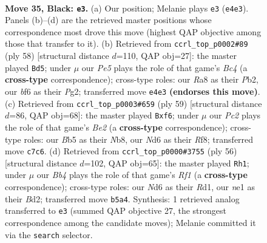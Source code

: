 \documentclass[11pt]{article}
\begin{document}
\clearpage

\begin{figure}[p]\centering
\begin{subfigure}{0.46\textwidth}\centering
\resizebox{\linewidth}{!}{%
\newchessgame
\chessboard[
  setfen={r3r3/1kp5/pP1n1B2/1b1N1p2/4p2R/1B6/1P3PP1/R2KN3 b - - 2 35},
  showmover=false,
  pgfstyle=straightmove, color=movearrow, markmove={e4-e3}
]}
\caption{}
\end{subfigure}\hfill
\begin{subfigure}{0.46\textwidth}\centering
\resizebox{\linewidth}{!}{%
\newchessgame
\chessboard[
  setfen={1k6/1p1b2r1/p1n4r/5p2/2BPnR2/P2R3P/1P2N1PK/8 w - - 1 30},
  showmover=false,
  pgfstyle=straightmove, color=movearrow, markmove={c4-d5}
]}
\caption{}
\end{subfigure}
\\[4pt]
\begin{subfigure}{0.46\textwidth}\centering
\resizebox{\linewidth}{!}{%
\newchessgame
\chessboard[
  setfen={1n3r2/4bk1p/p1r1pPpP/1p1n4/3P4/1P3N2/R2B1PB1/4R1K1 b - - 0 30},
  showmover=false,
  pgfstyle=straightmove, color=movearrow, markmove={e7-f6}
]}
\caption{}
\end{subfigure}\hfill
\begin{subfigure}{0.46\textwidth}\centering
\resizebox{\linewidth}{!}{%
\newchessgame
\chessboard[
  setfen={1b2k3/1p2nbp1/2r2p2/p2p1P2/8/P1NP1B2/1P1BP2r/1K1R1R2 w - - 1 29},
  showmover=false,
  pgfstyle=straightmove, color=movearrow, markmove={f1-h1}
]}
\caption{}
\end{subfigure}
\caption{\textbf{Move 35, Black: \texttt{e3}.} (a) Our position; Melanie plays \texttt{e3} (\texttt{e4e3}). Panels (b)--(d) are the retrieved master positions whose correspondence most drove this move (highest QAP objective among those that transfer to it). (b) Retrieved from \texttt{ccrl\_top\_p0002\#89} (ply 58) [structural distance $d$=110, QAP obj=27]: the master played \texttt{Bd5}; under $\mu$ our \emph{Pe5} plays the role of that game's \emph{Bc4} (a \textbf{cross-type} correspondence); cross-type roles: our \emph{R}a8 as their \emph{P}b2, our \emph{b}f6 as their \emph{P}g2; transferred move \texttt{e4e3} \textbf{(endorses this move)}. (c) Retrieved from \texttt{ccrl\_top\_p0003\#659} (ply 59) [structural distance $d$=86, QAP obj=68]: the master played \texttt{Bxf6}; under $\mu$ our \emph{Pc2} plays the role of that game's \emph{Be2} (a \textbf{cross-type} correspondence); cross-type roles: our \emph{B}b5 as their \emph{N}b8, our \emph{N}d6 as their \emph{R}f8; transferred move \texttt{c7c6}. (d) Retrieved from \texttt{ccrl\_top\_p0000\#3755} (ply 56) [structural distance $d$=102, QAP obj=65]: the master played \texttt{Rh1}; under $\mu$ our \emph{Bb4} plays the role of that game's \emph{Rf1} (a \textbf{cross-type} correspondence); cross-type roles: our \emph{N}d6 as their \emph{R}d1, our \emph{n}e1 as their \emph{B}d2; transferred move \texttt{b5a4}. Synthesis: 1 retrieved analog transferred to \texttt{e3} (summed QAP objective 27, the strongest correspondence among the candidate moves); Melanie committed it via the \texttt{search} selector.}
\label{fig:thought-m69}
\end{figure}
\end{document}
